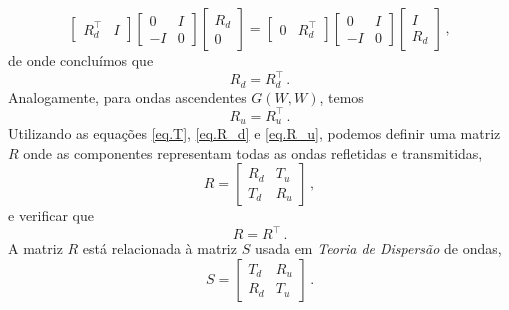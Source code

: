 \begin{equation}
\begin{bmatrix}
R_d^\top&I
\end{bmatrix}
\begin{bmatrix}
0&I\\
-I&0
\end{bmatrix}
\begin{bmatrix}
R_d\\
0
\end{bmatrix}
=
\begin{bmatrix}
0&R_d^\top
\end{bmatrix}
\begin{bmatrix}
0&I\\
-I&0
\end{bmatrix}
\begin{bmatrix}
I\\
R_d
\end{bmatrix}\,,
\end{equation}
de onde conclu\'imos que 
\begin{equation}\label{eq.R_d}
R_d=R_d^\top\,.
\end{equation}
Analogamente, para ondas ascendentes $G(W,W)$, temos \begin{equation}\label{eq.R_u}
R_u=R_u^\top\,.
\end{equation}
Utilizando as equa\c{c}\~oes \ref{eq.T}, \ref{eq.R_d} e \ref{eq.R_u}, podemos definir uma matriz $R$ onde as componentes representam todas as ondas refletidas e transmitidas,
\begin{equation}
R=
\begin{bmatrix}
R_d&T_u\\
T_d&R_u
\end{bmatrix}\,,
\end{equation}
e verificar que 
\begin{equation}
R=R^\top\,.
\end{equation}
A matriz $R$ est\'a relacionada \`a matriz $S$ usada em \textit{Teoria de Dispers\~ao} de ondas,
\begin{equation}
S=
\begin{bmatrix}
T_d&R_u\\
R_d&T_u
\end{bmatrix}\,.
\end{equation}